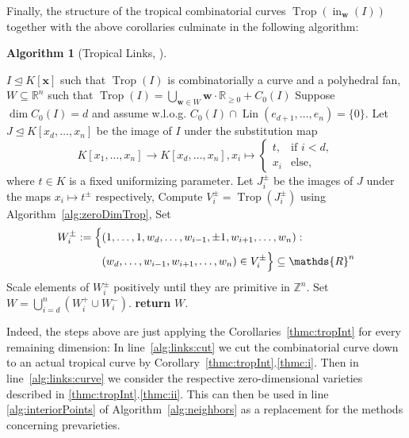 \documentclass[
  paper=a4,
  titlepage,
  bibliography=totoc,
  listof=totoc,
  pagesize=pdftex
]{scrartcl}
\numberwithin{figure}{section}
\numberwithin{equation}{section}
\numberwithin{table}{section}
\newcommand*\setZ{\mathds{Z}}
\newcommand*\setR{\mathds{R}}
\let\vec\mathbf
\let\idealof\trianglelefteq
\DeclareMathOperator{\Trop}{Trop}
\DeclareMathOperator{\initial}{in}
\DeclareMathOperator{\Lin}{Lin}
\theoremstyle{definition}
\newtheorem{algo}[definition]{Algorithm}
\numberwithin{definition}{section}
\begin{document}
Finally, the structure of the tropical combinatorial curves $\Trop(\initial_{\vec w}(I))$ together
with the above corollaries culminate in the following algorithm:

\begin{algo}[Tropical Links, {\cite[Algorithm~4.5]{tropPointsLinks}}] $ $
  \begin{algorithmic}[1]
    \Require $I \idealof K[\vec x]$ such that $\Trop(I)$ is combinatorially a curve and a
    polyhedral fan,
    \Ensure $W \subseteq \setR^n$ such that $\Trop(I) = \bigcup_{\vec w \in W} \vec w
      \cdot \setR_{\geq0} + C_0(I)$
    \State Suppose $\dim C_0(I) = d$ and assume w.l.o.g. $C_0(I) \cap \Lin(e_{d+1}, \dots,
      e_n) = \{0\}$.
    \State Let $J \idealof K[x_d, \dots, x_n]$ be the image of $I$ under the substitution
      map
      \[
        K[x_1, \dots, x_n] \to K[x_d, \dots, x_n], x_i \mapsto
        \begin{cases}
          t, & \text{if } i < d, \\
          x_i & \text{else},
        \end{cases}
      \]
      where $t \in K$ is a fixed uniformizing parameter.
      \label{alg:links:cut}
      \State Let $J_i^\pm$ be the images of $J$ under the maps $x_i \mapsto t^\pm$
        respectively,
        \label{alg:links:curve}
      \State Compute $V_i^\pm = \Trop(J_i^\pm)$ using Algorithm~\ref{alg:zeroDimTrop},
      \State Set
        \begin{align*}
          W_i^\pm := \Bigl\{
            &(1, \dots, 1, w_d, \dots, w_{i-1}, \pm1, w_{i+1}, \dots, w_n) : \\
            &(w_d, \dots, w_{i-1}, w_{i+1}, \dots, w_n) \in V_i^\pm
          \Bigr\} \subseteq \setR^n
        \end{align*}
      \State Scale elements of $W_i^\pm$ positively until they are primitive in $\setZ^n$.
    \EndFor
    \State Set $W = \bigcup_{i=d}^n (W_i^+ \cup W_i^-)$.
    \State\textbf{return} $W$.
  \end{algorithmic}
\end{algo}

Indeed, the steps above are just applying the Corollaries~\ref{thmc:tropInt} for every
remaining dimension: In line~\ref{alg:links:cut} we cut the combinatorial curve down to an
actual tropical curve by Corollary~\ref{thmc:tropInt}.\ref{thmc:i}. Then in
line~\ref{alg:links:curve} we consider the respective zero-dimensional varieties described
in \ref{thmc:tropInt}.\ref{thmc:ii}.
This can then be used in line \ref{alg:interiorPoints}
of Algorithm~\ref{alg:neighbors} as a replacement for the methods concerning
prevarieties.
\end{document}
